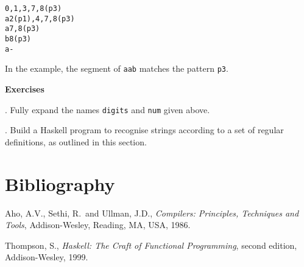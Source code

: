 \documentclass[11pt]{article}
\begin{document}
\begin{alltt}
     0,1,3,7,8(p3)
a    2(p1),4,7,8(p3)
a    7,8(p3)
b    8(p3)
a    -
\end{alltt}
In the example, the segment of {\tt aab} matches the pattern {\tt p3}.

\medskip
\noindent
{\bf Exercises}

\medskip
{}. Fully expand the names {\tt digits} and {\tt num} given above.

\medskip
{}. Build a Haskell program to recognise strings according to a set of regular
definitions, as outlined in this section.

\section*{Bibliography}

\noindent
[Aho {\em et.\ al.}] Aho, A.V., Sethi, R.\ and Ullman, J.D., {\em Compilers:
Principles, Techniques and Tools}, Addison-Wesley, Reading, MA, USA, 1986.

\medskip
\noindent
[Thompson] Thompson, S., {\em Haskell: The Craft of Functional Programming},
second edition,
Addison-Wesley, 1999.
\end{document}
